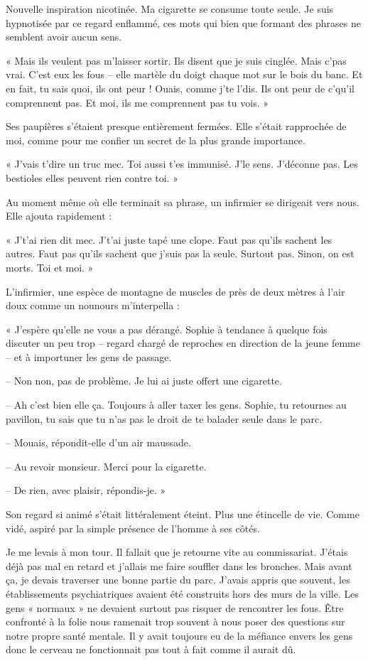 Nouvelle inspiration nicotinée. Ma cigarette se consume toute seule. Je suis hypnotisée par ce regard enflammé, ces 
mots qui bien que formant des phrases ne semblent avoir aucun sens.

« Mais ils veulent pas m'laisser sortir. Ils disent que je suis cinglée. Mais c'pas vrai. C'est eux les fous -- elle 
martèle du doigt chaque mot sur le bois du banc. Et en fait, tu sais quoi, ils ont peur ! Ouais, comme j'te l'dis. Ils 
ont peur de c'qu'il comprennent pas. Et moi, ils me comprennent pas tu vois. »

Ses paupières s'étaient presque entièrement fermées. Elle s'était rapprochée de moi, comme pour me confier un secret de 
la plus grande importance.

« J'vais t'dire un truc mec. Toi aussi t'es immunisé. J'le sens. J'déconne pas. Les bestioles elles peuvent rien 
contre toi. »

Au moment même où elle terminait sa phrase, un infirmier se dirigeait vers nous. Elle ajouta rapidement :

« J't'ai rien dit mec. J't'ai juste tapé une clope. Faut pas qu'ils sachent les autres. Faut pas qu'ils sachent que 
j'suis pas la seule. Surtout pas. Sinon, on est morts. Toi et moi. »

L'infirmier, une espèce de montagne de muscles de près de deux mètres à l'air doux comme un nounours m'interpella :

« J'espère qu'elle ne vous a pas dérangé. Sophie à tendance à quelque fois discuter un peu trop -- regard chargé de 
reproches en direction de la jeune femme -- et à importuner les gens de passage.

-- Non non, pas de problème. Je lui ai juste offert une cigarette.

-- Ah c'est bien elle ça. Toujours à aller taxer les gens. Sophie, tu retournes au pavillon, tu sais que tu n'as pas le 
droit de te balader seule dans le parc.

-- Mouais, répondit-elle d'un air maussade.

-- Au revoir monsieur. Merci pour la cigarette.

-- De rien, avec plaisir, répondis-je. »

Son regard si animé s'était littéralement éteint. Plus une étincelle de vie. Comme vidé, aspiré par la simple présence 
de l'homme à ses côtés.

Je me levais à mon tour. Il fallait que je retourne vite au commissariat. J'étais déjà pas mal en retard et 
j'allais me faire souffler dans les bronches. Mais avant ça, je devais traverser une bonne partie du parc.  J'avais 
appris que souvent, les établissements psychiatriques avaient été construits hors des murs de la ville. Les gens 
« normaux » ne devaient surtout pas risquer de rencontrer les fous. Être confronté à la folie nous ramenait trop 
souvent à nous poser des questions sur notre propre santé mentale. Il y avait toujours eu de la méfiance envers les gens 
donc le cerveau ne fonctionnait pas tout à fait comme il aurait dû.


